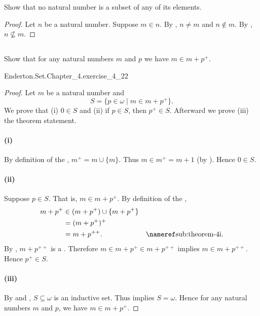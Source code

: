 \documentclass{report}
\begin{document}
  Show that no natural number is a subset of any of its elements.

  \begin{proof}
    Let $n$ be a natural number.
    Suppose $m \in n$.
    By , $n \neq m$ and
      $n \not\in m$.
    By , $n \not\subseteq m$.
  \end{proof}

\subsection{}%

  Show that for any natural numbers $m$ and $p$ we have $m \in m + p^+$.

    {Enderton.Set.Chapter\_4.exercise\_4\_22}

  \begin{proof}

    Let $m$ be a natural number and $$S = \{p \in \omega \mid m \in m + p^+\}.$$
    We prove that (i) $0 \in S$ and (ii) if $p \in S$, then $p^+ \in S$.
    Afterward we prove (iii) the theorem statement.

    \paragraph{(i)}%

      By definition of the , $m^+ = m \cup \{m\}$.
      Thus $m \in m^+ = m + 1$ (by ).
      Hence $0 \in S$.

    \paragraph{(ii)}%

      Suppose $p \in S$.
      That is, $m \in m + p^+$.
      By definition of the ,
        \begin{align*}
          m + p^+
            & \in (m + p^+) \cup \{m + p^+\} \\
            & = (m + p^+)^+ \\
            & = m + p^{++}. & \textref{sub:theorem-4i}.
        \end{align*}
      By , $m + p^{++}$ is a
        .
      Therefore $m \in m + p^+ \in m + p^{++}$ implies $m \in m + p^{++}$.
      Hence $p^+ \in S$.

    \paragraph{(iii)}%

      By  and ,
        $S \subseteq \omega$ is an inductive set.
      Thus  implies $S = \omega$.
      Hence for any natural numbers $m$ and $p$, we have $m \in m + p^+$.

  \end{proof}
\end{document}
